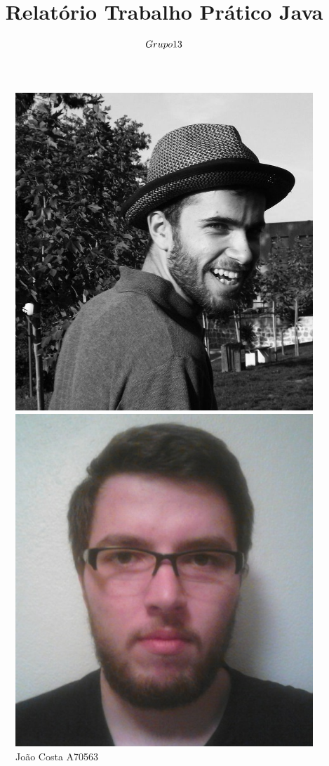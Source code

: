 \documentclass[10pt] {article}
\begin{document}
\title{Relatório Trabalho Prático Java \\ $\small{Grupo 13}$}

\maketitle

\begin{figure}[!htb]
  \includegraphics[width=\linewidth]{jc.jpg}
  \caption{João Costa A70563}\label{fig:awesome_image1}
\endminipage\hfill
{}
  \includegraphics[width=\linewidth]{ls.jpg}

\end{figure}
\end{document}
